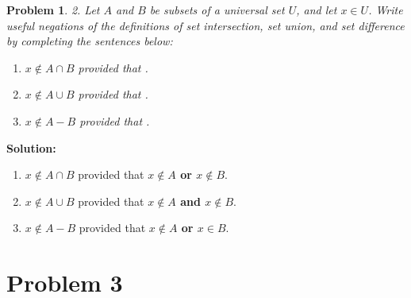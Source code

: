 \documentclass[12pt]{article}
\newtheorem{problem}{Problem}
\theoremstyle{definition}
\begin{document}
\begin{problem}
2. Let $A$ and $B$ be subsets of a universal set $U$, and let $x \in U$. Write useful negations of the definitions of set intersection, set union, and set difference by completing the sentences below:

\begin{enumerate}[label=(\alph*)]
    \item $x \notin A \cap B$ provided that \underline{\hspace{4cm}}.
    \item $x \notin A \cup B$ provided that \underline{\hspace{4cm}}.
    \item $x \notin A - B$ provided that \underline{\hspace{4cm}}.
\end{enumerate}
\end{problem}

\textbf{Solution:}

\begin{enumerate}[label=(\alph*)]
    \item $x \notin A \cap B$ provided that \textbf{$x \notin A$ or $x \notin B$}.

    \item $x \notin A \cup B$ provided that \textbf{$x \notin A$ and $x \notin B$}.

    \item $x \notin A - B$ provided that \textbf{$x \notin A$ or $x \in B$}.
\end{enumerate}

\newpage

\section*{Problem 3}
\end{document}

